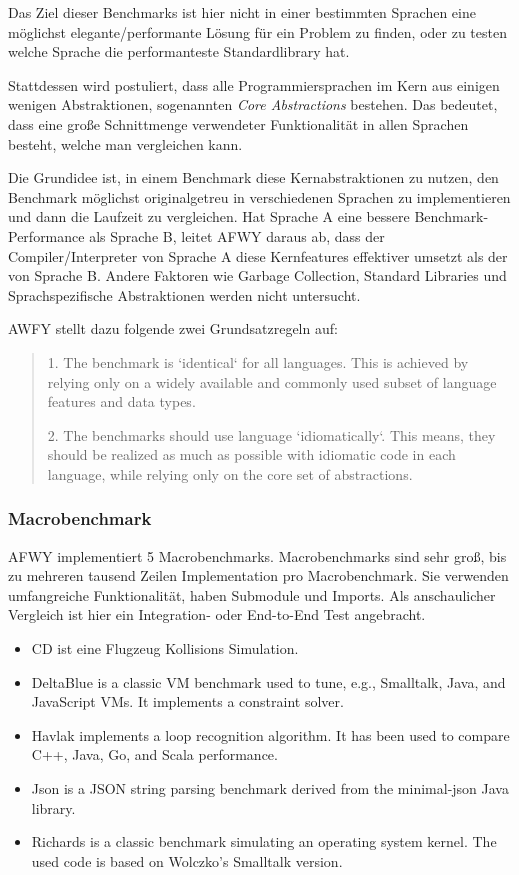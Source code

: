 Das Ziel dieser Benchmarks ist hier nicht in einer bestimmten Sprachen eine möglichst elegante/performante Lösung für ein Problem zu finden, oder zu testen welche Sprache die performanteste Standardlibrary hat.

Stattdessen wird postuliert, dass alle Programmiersprachen im Kern aus einigen wenigen Abstraktionen, sogenannten \textit{Core Abstractions} bestehen.  Das bedeutet, dass eine große Schnittmenge verwendeter Funktionalität in allen Sprachen besteht, welche man vergleichen kann. 


Die Grundidee ist, in einem Benchmark diese Kernabstraktionen zu nutzen, den Benchmark möglichst originalgetreu in verschiedenen Sprachen zu implementieren und dann die Laufzeit zu vergleichen. Hat Sprache A eine bessere Benchmark-Performance als Sprache B, leitet AFWY daraus ab, dass der Compiler/Interpreter von Sprache A diese Kernfeatures effektiver umsetzt als der von Sprache B.
Andere Faktoren wie Garbage Collection, Standard Libraries und Sprachspezifische Abstraktionen werden nicht untersucht.

AWFY stellt dazu folgende zwei Grundsatzregeln auf:
\begin{quote}
    1. The benchmark is `identical` for all languages.
    This is achieved by relying only on a widely available and commonly used subset of language features and data types.

    2. The benchmarks should use language `idiomatically`.
    This means, they should be realized as much as possible with idiomatic code in each language, while relying only on the core set of abstractions.
\end{quote}

\subsubsection{Macrobenchmark}
AFWY implementiert 5 Macrobenchmarks. 
Macrobenchmarks sind sehr groß, bis zu mehreren tausend Zeilen Implementation pro Macrobenchmark. Sie verwenden umfangreiche Funktionalität, haben Submodule und Imports. Als anschaulicher Vergleich ist hier ein Integration- oder End-to-End Test angebracht.

\begin{itemize}
\item CD ist eine Flugzeug Kollisions Simulation. 
\item DeltaBlue is a classic VM benchmark used to tune, e.g., Smalltalk, Java, and JavaScript VMs. It implements a constraint solver.
\item Havlak implements a loop recognition algorithm. It has been used to compare C++, Java, Go, and Scala performance.
\item Json is a JSON string parsing benchmark derived from the minimal-json Java library.
\item Richards is a classic benchmark simulating an operating system kernel. The used code is based on Wolczko's Smalltalk version.
\end{itemize}

